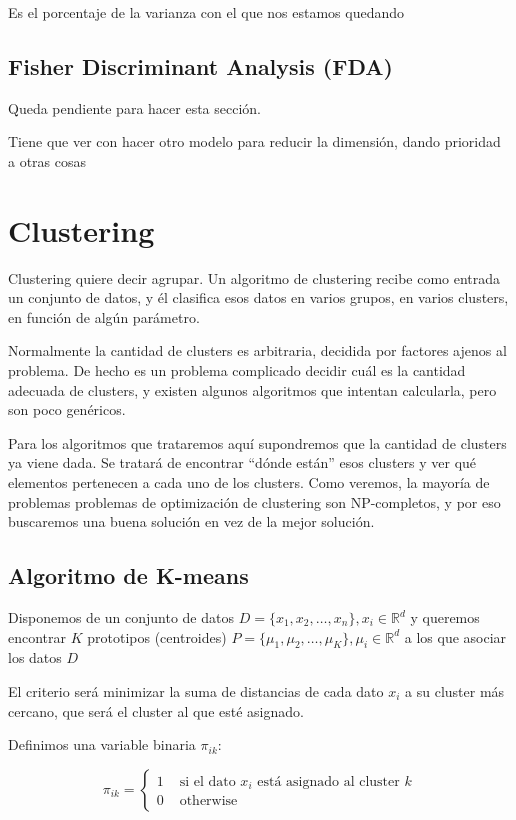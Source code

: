 \documentclass[a4paper,10pt]{article}
\begin{document}
Es el porcentaje de la varianza con el que nos estamos quedando

\subsection{Fisher Discriminant Analysis (FDA)}
Queda pendiente para hacer esta sección.

Tiene que ver con hacer otro modelo para reducir la dimensión, dando prioridad a otras cosas

\section{Clustering}
Clustering quiere decir agrupar. Un algoritmo de clustering recibe como entrada un conjunto de datos, y él clasifica esos datos en varios grupos, en varios clusters, en función de algún parámetro.

Normalmente la cantidad de clusters es arbitraria, decidida por factores ajenos al problema. De hecho es un problema complicado decidir cuál es la cantidad adecuada de clusters, y existen algunos algoritmos que intentan calcularla, pero son poco genéricos.

Para los algoritmos que trataremos aquí supondremos que la cantidad de clusters ya viene dada. Se tratará de encontrar ``dónde están'' esos clusters y ver qué elementos pertenecen a cada uno de los clusters. Como veremos, la mayoría de problemas problemas de optimización de clustering son NP-completos, y por eso buscaremos una buena solución en vez de la mejor solución.

\subsection{Algoritmo de K-means}
Disponemos de un conjunto de datos $D = \{x_1, x_2, \dots, x_n\}, x_i \in \mathbb{R}^d$ y queremos encontrar $K$ prototipos (centroides) $P = \{\mu_1, \mu_2, \dots, \mu_K\}, \mu_i \in \mathbb{R}^d$ a los que asociar los datos $D$

El criterio será minimizar la suma de distancias de cada dato $x_i$ a su cluster más cercano, que será el cluster al que esté asignado.

Definimos una variable binaria $\pi_{ik}$:

\begin{equation*}
\pi_{ik} =
\begin{cases}
1 & \text{ si el dato $x_i$ está asignado al cluster $k$} \\
0  & \text{ otherwise}
\end{cases}
\end{equation*}
\end{document}
